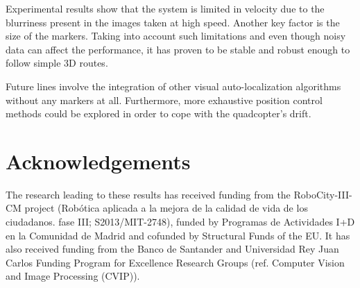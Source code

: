 \documentclass{styles/svproc}
\begin{document}
	Experimental results show that the system is limited in velocity due to the blurriness present in the images taken at high speed. Another key factor is the size of the markers. Taking into account such limitations and even though noisy data can affect the performance, it has proven to be stable and robust enough to follow simple 3D routes.

        Future lines involve the integration of other visual auto-localization algorithms without any markers at all. Furthermore, more exhaustive position control methods could be explored in order to cope with the quadcopter's drift.

        \section*{Acknowledgements}

        The research leading to these results has received funding from the RoboCity\--III\--CM project (Rob\'otica aplicada a la mejora de la calidad de vida de los ciudadanos. fase III; S2013/MIT-2748), funded by Programas de Actividades I+D en la Comunidad de Madrid and cofunded by Structural Funds of the EU. It has also received funding from
the Banco de Santander and Universidad Rey Juan Carlos Funding Program for Excellence Research Groups (ref. Computer Vision and Image Processing (CVIP)).
\end{document}
